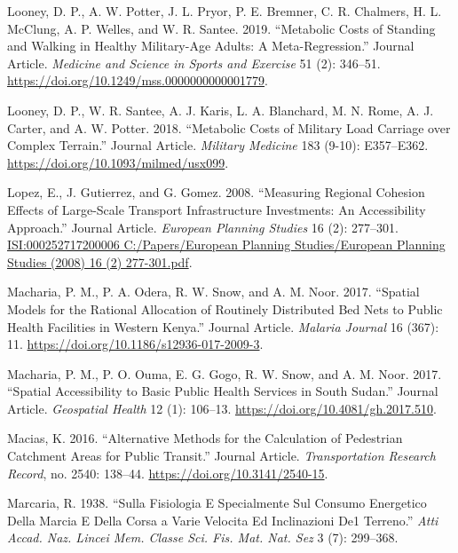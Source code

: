 \documentclass[]{elsarticle} %
\begin{document}
\leavevmode\hypertarget{ref-Looney2019metabolic}{}%
Looney, D. P., A. W. Potter, J. L. Pryor, P. E. Bremner, C. R. Chalmers,
H. L. McClung, A. P. Welles, and W. R. Santee. 2019. ``Metabolic Costs
of Standing and Walking in Healthy Military-Age Adults: A
Meta-Regression.'' Journal Article. \emph{Medicine and Science in Sports
and Exercise} 51 (2): 346--51.
\url{https://doi.org/10.1249/mss.0000000000001779}.

\leavevmode\hypertarget{ref-Looney2018metabolic}{}%
Looney, D. P., W. R. Santee, A. J. Karis, L. A. Blanchard, M. N. Rome,
A. J. Carter, and A. W. Potter. 2018. ``Metabolic Costs of Military Load
Carriage over Complex Terrain.'' Journal Article. \emph{Military
Medicine} 183 (9-10): E357--E362.
\url{https://doi.org/10.1093/milmed/usx099}.

\leavevmode\hypertarget{ref-Lopez2008}{}%
Lopez, E., J. Gutierrez, and G. Gomez. 2008. ``Measuring Regional
Cohesion Effects of Large-Scale Transport Infrastructure Investments: An
Accessibility Approach.'' Journal Article. \emph{European Planning
Studies} 16 (2): 277--301.
\href{ISI:000252717200006\%0AC:/Papers/European\%20Planning\%20Studies/European\%20Planning\%20Studies\%20(2008)\%2016\%20(2)\%20277-301.pdf}{ISI:000252717200006
C:/Papers/European Planning Studies/European Planning Studies (2008) 16 (2) 277-301.pdf}.

\leavevmode\hypertarget{ref-Macharia2017}{}%
Macharia, P. M., P. A. Odera, R. W. Snow, and A. M. Noor. 2017.
``Spatial Models for the Rational Allocation of Routinely Distributed
Bed Nets to Public Health Facilities in Western Kenya.'' Journal
Article. \emph{Malaria Journal} 16 (367): 11.
\url{https://doi.org/10.1186/s12936-017-2009-3}.

\leavevmode\hypertarget{ref-Macharia2017accessibility}{}%
Macharia, P. M., P. O. Ouma, E. G. Gogo, R. W. Snow, and A. M. Noor.
2017. ``Spatial Accessibility to Basic Public Health Services in South
Sudan.'' Journal Article. \emph{Geospatial Health} 12 (1): 106--13.
\url{https://doi.org/10.4081/gh.2017.510}.

\leavevmode\hypertarget{ref-Macias2016alternative}{}%
Macias, K. 2016. ``Alternative Methods for the Calculation of Pedestrian
Catchment Areas for Public Transit.'' Journal Article.
\emph{Transportation Research Record}, no. 2540: 138--44.
\url{https://doi.org/10.3141/2540-15}.

\leavevmode\hypertarget{ref-Marcaria1938sulla}{}%
Marcaria, R. 1938. ``Sulla Fisiologia E Specialmente Sul Consumo
Energetico Della Marcia E Della Corsa a Varie Velocita Ed Inclinazioni
De1 Terreno.'' \emph{Atti Accad. Naz. Lincei Mem. Classe Sci. Fis. Mat.
Nat. Sez} 3 (7): 299--368.
\end{document}
